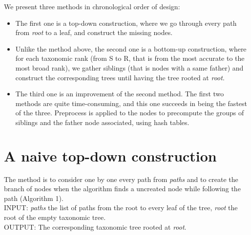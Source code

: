 \documentclass{report}
\begin{document}
We present three methods in chronological order of design:
\begin{itemize}
\item The first one is a top-down construction, where we go through every path from \emph{root} to a leaf, and construct the missing nodes.
\item Unlike the method above, the second one is a bottom-up construction, where for each taxonomic rank (from S to R, that is from the most accurate to the most broad rank), we gather siblings (that is nodes with a same father) and construct the corresponding trees until having the tree rooted at \emph{root}.
\item The third one is an improvement of the second method. The first two methods are quite time-consuming, and this one succeeds in being the fastest of the three. Preprocess is applied to the nodes to precompute the groups of siblings and the father node associated, using hash tables.
\end{itemize}

\section{A naive top-down construction}

The method is to consider one by one every path from \emph{paths} and to create the branch of nodes when the algorithm finds a uncreated node while following the path (Algorithm 1).\\

\textsc{INPUT:} \emph{paths} the list of paths from the root to every leaf of the tree, \emph{root} the root of the empty taxonomic tree.\\

\textsc{OUTPUT:} The corresponding taxonomic tree rooted at \emph{root}.\\
\end{document}
